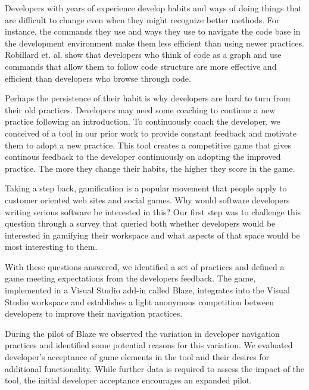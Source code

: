 \documentclass{sig-alternate}
\begin{document}

Developers with years of experience develop habits and ways of doing things that are difficult to change even when they might recognize better methods.   For instance, the commands they use and ways they use to navigate the code base in the development environment make them less efficient than using newer practices. Robillard et. al. show that developers who think of code as a graph and use commands that allow them to follow code structure are more effective and efficient than developers who browse through code. \cite{wbsnipes:Robillard2004How}  

Perhaps the persistence of their habit is why developers are hard to turn from their old practices.  Developers may need some coaching to continue a new practice following an introduction.  To continuously coach the developer, we conceived of a tool in our prior work to provide constant feedback and motivate them to adopt a new practice.  \cite{Snipes2013Towards} This tool creates a competitive game that gives continous feedback to the developer continuously on adopting the improved practice.  The more they change their habits, the higher they score in the game. 

Taking a step back, gamification is a popular movement that people apply to customer oriented web sites and social games.  Why would software developers writing serious software be interested in this?  Our first step was to challenge this question through a survey that queried both whether developers would be interested in gamifying their workspace and what aspects of that space would be most interesting to them.

With these questions answered, we identified a set of practices and defined a game meeting expectations from the developers feedback.  The game, implemented in a Visual Studio add-in called Blaze, integrates into the Visual Studio workspace and establishes a light anonymous competition between developers to improve their navigation practices. 

During the pilot of Blaze we observed the variation in developer navigation practices and identified some potential reasons for this variation.  We evaluated developer's acceptance of game elements in the tool and their desires for additional functionality.  While further data is required to assess the impact of the tool, the initial developer acceptance encourages an expanded pilot.
\end{document}

